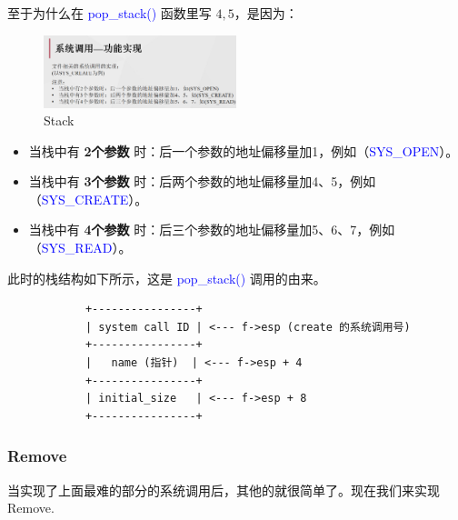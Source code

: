 \documentclass[14pt,a4paper,UTF8,twoside]{article}
\renewcommand{\texttt}[1]{\textcolor{blue}{\ttfamily #1}}
\begin{document}
至于为什么在 \texttt{pop\_stack()} 函数里写 $4, 5$，是因为：

\begin{figure}[H]
    \centering
    \includegraphics[width=0.5\textwidth]{img6/number.png}
    \caption{Stack}
    \label{fig:stack}
\end{figure}

\begin{itemize}
    \item 当栈中有 \textbf{2个参数} 时：后一个参数的地址偏移量加1，例如（\texttt{SYS\_OPEN}）。
    \item 当栈中有 \textbf{3个参数} 时：后两个参数的地址偏移量加4、5，例如（\texttt{SYS\_CREATE}）。
    \item 当栈中有 \textbf{4个参数} 时：后三个参数的地址偏移量加5、6、7，例如（\texttt{SYS\_READ}）。
\end{itemize}

此时的栈结构如下所示，这是 \texttt{pop\_stack()} 调用的由来。

\begin{lstlisting}
            +----------------+
            | system call ID | <--- f->esp (create 的系统调用号)
            +----------------+
            |   name (指针)  | <--- f->esp + 4
            +----------------+
            | initial_size   | <--- f->esp + 8
            +----------------+    
\end{lstlisting}

\subsubsection{Remove}

当实现了上面最难的部分的系统调用后，其他的就很简单了。现在我们来实现 Remove.
\end{document}
